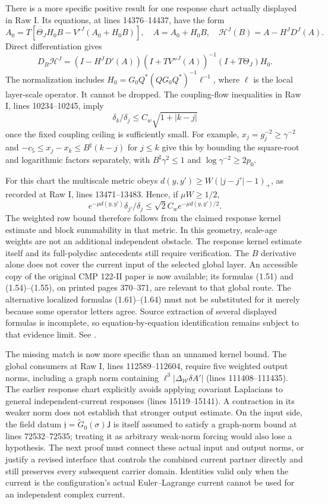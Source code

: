 \documentclass[11pt]{article}
\theoremstyle{remark}
\begin{document}
There is a more specific positive result for one response chart actually
displayed in Raw I. Its equations, at lines 14376--14437, have the form
\[
 A_0=T[\Theta_JH_0B-V'^J(A_0+H_0B)],\quad A=A_0+H_0B,
 \quad\mathcal H^J(B)=A-H^JD^J(A).
\]
Direct differentiation gives
\[
 D_B\mathcal H^J=(I-H^JD'(A))
 (I+TV''^J(A))^{-1}(I+T\Theta_J)H_0.
\]
The normalization includes
$H_0=G_0Q^*(QG_0Q^*)^{-1}\ell^{-1}$, where $\ell$ is the local
layer-scale operator. It cannot be dropped.
The coupling-flow inequalities in Raw I, lines 10234--10245, imply
\[
 \delta_k/\delta_j\leq C_w\sqrt{1+|k-j|}
\]
once the fixed coupling ceiling is sufficiently small. For example,
$x_j=g_j^{-2}\geq\gamma^{-2}$ and
$-c_5\leq x_j-x_k\leq B^\sharp(k-j)$ for $j\leq k$ give this by
bounding the square-root and logarithmic factors separately, with
$B^\sharp\gamma^2\leq1$ and $\log\gamma^{-2}\geq2p_0$.

For this chart the multiscale metric obeys
$d(y,y')\geq W(|j-j'|-1)_+$, as recorded at Raw I,
lines 13471--13483. Hence, if $\mu W\geq1/2$,
\[
 e^{-\mu d(y,y')}\delta_{j'}/\delta_j
 \leq\sqrt2 C_w e^{-\mu d(y,y')/2}.
\]
The weighted row bound therefore follows from the claimed response
kernel estimate and block summability in that metric. In this
geometry, scale-age weights are not an additional independent obstacle.
The response kernel estimate itself and its full-polydisc antecedents
still require verification. The $B$ derivative alone does not cover
the current input of the selected global layer. An accessible copy of
the original CMP 122-II paper is now available; its formulas (1.51)
and (1.54)--(1.55), on printed pages 370--371, are relevant to that
global route. The alternative localized formulas (1.61)--(1.64) must
not be substituted for it merely because some operator letters agree.
Source extraction of several displayed formulas is incomplete, so
equation-by-equation identification remains subject to that evidence
limit. See \cite{balaban122b}.

The missing match is now more specific than an unnamed kernel bound.
The global consumers at Raw I, lines 112589--112604, require five
weighted output norms, including a graph norm containing
$\ell^3|\Delta_{\mathcal W}\delta A'|$ (lines 111408--111435).
The earlier response chart explicitly avoids applying covariant
Laplacians to general independent-current responses
(lines 15119--15141). A contraction in its weaker norm does not
establish that stronger output estimate. On the input side, the
field datum $\mathfrak j=\widetilde G_0(\sigma)\mathsf J$ is itself
assumed to satisfy a graph-norm bound at lines 72532--72535; treating
it as arbitrary weak-norm forcing would also lose a hypothesis.
The next proof must connect these actual input and output norms,
or justify a revised interface that controls the combined current
partner directly and still preserves every subsequent carrier domain.
Identities valid only when the current is the configuration's actual
Euler--Lagrange current cannot be used for an independent complex current.
\end{document}
